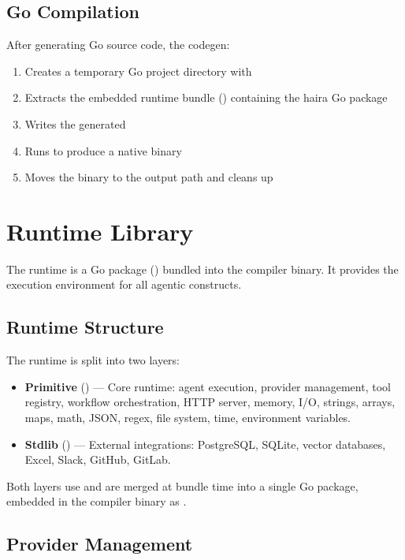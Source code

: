 \subsection{Go Compilation}

After generating Go source code, the codegen:

\begin{enumerate}
    \item Creates a temporary Go project directory with 
    \item Extracts the embedded runtime bundle () containing the haira Go package
    \item Writes the generated 
    \item Runs  to produce a native binary
    \item Moves the binary to the output path and cleans up
\end{enumerate}

\section{Runtime Library}
\label{sec:runtime}

The \haira{} runtime is a Go package () bundled into the compiler binary. It provides the execution environment for all agentic constructs.

\subsection{Runtime Structure}

The runtime is split into two layers:

\begin{itemize}
    \item \textbf{Primitive} () --- Core runtime: agent execution, provider management, tool registry, workflow orchestration, HTTP server, memory, I/O, strings, arrays, maps, math, JSON, regex, file system, time, environment variables.
    \item \textbf{Stdlib} () --- External integrations: PostgreSQL, SQLite, vector databases, Excel, Slack, GitHub, GitLab.
\end{itemize}

Both layers use  and are merged at bundle time into a single Go package, embedded in the compiler binary as .

\subsection{Provider Management}

